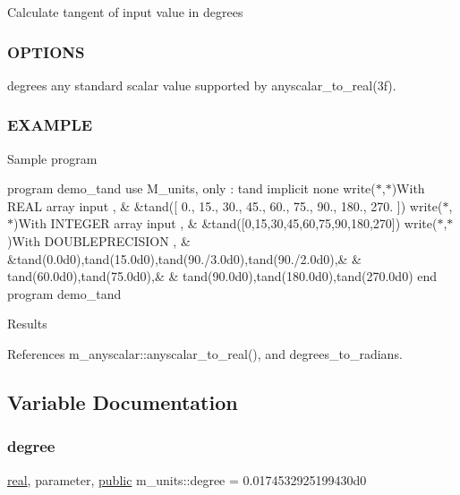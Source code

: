 Calculate tangent of input value in degrees

\subsubsection*{O\+P\+T\+I\+O\+NS}

degrees any standard scalar value supported by anyscalar\+\_\+to\+\_\+real(3f). \subsubsection*{E\+X\+A\+M\+P\+LE}

Sample program

program demo\+\_\+tand use M\+\_\+units, only \+: tand implicit none write($\ast$,$\ast$)\textquotesingle{}With R\+E\+AL array input \textquotesingle{}, \& \&tand(\mbox{[} 0., 15., 30., 45., 60., 75., 90., 180., 270. \mbox{]}) write($\ast$,$\ast$)\textquotesingle{}With I\+N\+T\+E\+G\+ER array input \textquotesingle{}, \& \&tand(\mbox{[}0,15,30,45,60,75,90,180,270\mbox{]}) write($\ast$,$\ast$)\textquotesingle{}With D\+O\+U\+B\+L\+E\+P\+R\+E\+C\+I\+S\+I\+ON \textquotesingle{}, \& \&tand(0.\+0d0),tand(15.\+0d0),tand(90./3.0d0),tand(90./2.0d0),\& \& tand(60.\+0d0),tand(75.\+0d0),\& \& tand(90.\+0d0),tand(180.\+0d0),tand(270.\+0d0) end program demo\+\_\+tand

Results 

References m\+\_\+anyscalar\+::anyscalar\+\_\+to\+\_\+real(), and degrees\+\_\+to\+\_\+radians.



\subsection{Variable Documentation}
\mbox{\label{namespacem__units_a3ffc2cf87c0db17c71fa0a7bbee8eb9c}} 
\subsubsection{\texorpdfstring{degree}{degree}}
{\footnotesize\ttfamily \hyperlink{read__watch_83_8txt_abdb62bde002f38ef75f810d3a905a823}{real}, parameter, \hyperlink{M__stopwatch_83_8txt_a2f74811300c361e53b430611a7d1769f}{public} m\+\_\+units\+::degree = 0.\+0174532925199430d0}

\mbox{\label{namespacem__units_a00df65cb71220d4fe1c654d5b4ba4851}} 
